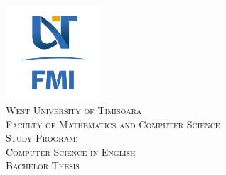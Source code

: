 \documentclass[12pt, a4paper]{report}
\begin{document}

\begin{titlepage}

\newcommand{\HRule}{\rule{\linewidth}{0.5mm}} %

\center %


\vspace{-20pt}
\includegraphics[width=100pt]{FMI-03.png}\\[1.0cm] %
 
\textsc{\LARGE West University of  Timisoara}\\[0.5cm] %
\textsc{\Large Faculty of Mathematics and Computer Science}\\[0.5cm] %
\textsc{\large Study Program: \\Computer Science in English}\\[3cm] %


\textsc{\Huge Bachelor Thesis}\\[5cm]

 


\end{titlepage}
\end{document}
